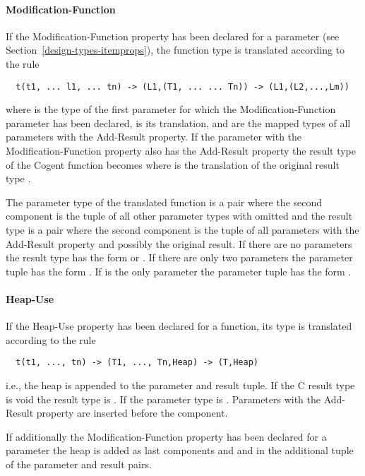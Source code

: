 \paragraph{Modification-Function}

If the Modification-Function property has been declared for a parameter (see Section~\ref{design-types-itemprops}), 
the function type is translated according to the rule
\begin{verbatim}
  t(t1, ... l1, ... tn) -> (L1,(T1, ... ... Tn)) -> (L1,(L2,...,Lm))
\end{verbatim}
where  is the type of the first parameter for which the Modification-Function parameter has been declared, 
is its translation, and  are the mapped types of all parameters with the Add-Result
property. If the parameter with the Modification-Function property also has the Add-Result property the result type 
of the Cogent function becomes  where  is the translation of the original result type .

The parameter type of
the translated function is a pair where the second component is the tuple of all other parameter types with 
omitted and the result type is a pair where the second component is the tuple of all 
parameters with the Add-Result property and possibly the original result. If there are no parameters  the result type 
has the form  or . If there
are only two parameters the parameter tuple has the form . If  is the only parameter the parameter tuple
has the form . 

\paragraph{Heap-Use}

If the Heap-Use property has been declared for a function, its type is translated according to the rule
\begin{verbatim}
  t(t1, ..., tn) -> (T1, ..., Tn,Heap) -> (T,Heap)
\end{verbatim}
i.e., the heap is appended to the parameter and result tuple. If the C result type is void the result type is .
If  the parameter type is . Parameters with the Add-Result property are inserted before the 
component.

If additionally the Modification-Function property has been declared for a parameter the heap is added as last components  and
and  in the additional tuple of the parameter and result pairs.

